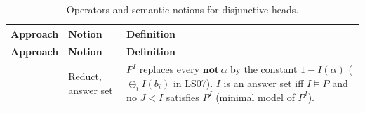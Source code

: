 {        \begin{longtable}{@{}p{}p{}p{}@{}}
            \caption{Operators and semantic notions for disjunctive heads.}\label{tab:operators}                                                                                                                                                                                                                                                                                                                                                                                                                                                                                                                                                    \\
            \toprule
            \textbf{Approach}                                                                        & \textbf{Notion}                                          & \textbf{Definition}                                                                                                                                                                                                                                                                                                                                                                                                                                                               \\
            \midrule\endfirsthead
            \toprule
            \textbf{Approach}                                                                        & \textbf{Notion}                                          & \textbf{Definition}                                                                                                                                                                                                                                                                                                                                                                                                                                                               \\
            \midrule\endhead
            \bottomrule\endfoot
            \cite{BlondeelSVD14,MushthofaSD14,MushthofaSD15,MushthofaSD20,AlvianoP15,LukasiewiczS07} & Reduct, answer set                                       & $P^I$ replaces every $\mathbf{not}\,\alpha$ by the constant $1-I(\alpha)$ ($\ominus_iI(b_i)$ in LS07). $I$ is an answer set iff $I\models P$ and no $J<I$ satisfies $P^I$ (minimal model of $P^I$).                                                                                                                                                                                                                                                                               \\

\end{longtable}}
